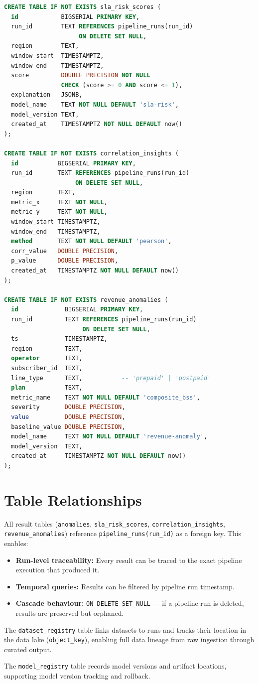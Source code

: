 \begin{lstlisting}[language=SQL, caption={Complete PostgreSQL DDL --- 8 tables.}]
CREATE TABLE IF NOT EXISTS sla_risk_scores (
  id            BIGSERIAL PRIMARY KEY,
  run_id        TEXT REFERENCES pipeline_runs(run_id)
                     ON DELETE SET NULL,
  region        TEXT,
  window_start  TIMESTAMPTZ,
  window_end    TIMESTAMPTZ,
  score         DOUBLE PRECISION NOT NULL
                CHECK (score >= 0 AND score <= 1),
  explanation   JSONB,
  model_name    TEXT NOT NULL DEFAULT 'sla-risk',
  model_version TEXT,
  created_at    TIMESTAMPTZ NOT NULL DEFAULT now()
);

CREATE TABLE IF NOT EXISTS correlation_insights (
  id           BIGSERIAL PRIMARY KEY,
  run_id       TEXT REFERENCES pipeline_runs(run_id)
                    ON DELETE SET NULL,
  region       TEXT,
  metric_x     TEXT NOT NULL,
  metric_y     TEXT NOT NULL,
  window_start TIMESTAMPTZ,
  window_end   TIMESTAMPTZ,
  method       TEXT NOT NULL DEFAULT 'pearson',
  corr_value   DOUBLE PRECISION,
  p_value      DOUBLE PRECISION,
  created_at   TIMESTAMPTZ NOT NULL DEFAULT now()
);

CREATE TABLE IF NOT EXISTS revenue_anomalies (
  id             BIGSERIAL PRIMARY KEY,
  run_id         TEXT REFERENCES pipeline_runs(run_id)
                      ON DELETE SET NULL,
  ts             TIMESTAMPTZ,
  region         TEXT,
  operator       TEXT,
  subscriber_id  TEXT,
  line_type      TEXT,           -- 'prepaid' | 'postpaid'
  plan           TEXT,
  metric_name    TEXT NOT NULL DEFAULT 'composite_bss',
  severity       DOUBLE PRECISION,
  value          DOUBLE PRECISION,
  baseline_value DOUBLE PRECISION,
  model_name     TEXT NOT NULL DEFAULT 'revenue-anomaly',
  model_version  TEXT,
  created_at     TIMESTAMPTZ NOT NULL DEFAULT now()
);
\end{lstlisting}

\section{Table Relationships}

All result tables (\texttt{anomalies}, \texttt{sla\_risk\_scores},
\texttt{correlation\_insights}, \texttt{revenue\_anomalies}) reference
\texttt{pipeline\_runs(run\_id)} as a foreign key. This enables:

\begin{itemize}
  \item \textbf{Run-level traceability:} Every result can be traced to the
        exact pipeline execution that produced it.
  \item \textbf{Temporal queries:} Results can be filtered by pipeline run
        timestamp.
  \item \textbf{Cascade behaviour:} \texttt{ON DELETE SET NULL} --- if a
        pipeline run is deleted, results are preserved but orphaned.
\end{itemize}

The \texttt{dataset\_registry} table links datasets to runs and tracks their
location in the data lake (\texttt{object\_key}), enabling full data lineage
from raw ingestion through curated output.

The \texttt{model\_registry} table records model versions and artifact
locations, supporting model version tracking and rollback.
